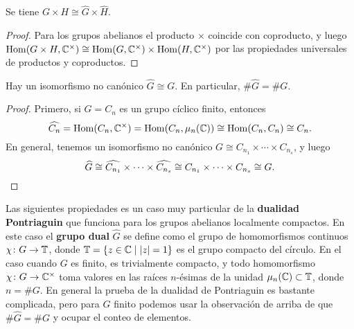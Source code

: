 \begin{lema}
  Se tiene $\widehat{G\times H} \cong \widehat{G}\times\widehat{H}$.

  \begin{proof}
    Para los grupos abelianos el producto $\times$ coincide con coproducto,
    y luego
    $\operatorname{Hom} (G\times H, \mathbb{C}^\times) \cong \operatorname{Hom} (G, \mathbb{C}^\times) \times \operatorname{Hom} (H, \mathbb{C}^\times)$
    por las propiedades universales de productos y coproductos.
  \end{proof}
\end{lema}

\begin{lema}
  Hay un isomorfismo no canónico $\widehat{G} \cong G$. En particular,
  $\#\widehat{G} = \# G$.

  \begin{proof}
    Primero, si $G = C_n$ es un grupo cíclico finito, entonces
    \[ \widehat{C_n} = \operatorname{Hom} (C_n, \mathbb{C}^\times) = \operatorname{Hom} (C_n, \mu_n (\mathbb{C})) \cong
    \operatorname{Hom} (C_n,C_n) \cong C_n. \]
    En general, tenemos un isomorfismo no canónico
    $G \cong C_{n_1}\times\cdots\times C_{n_s}$, y luego
    \[ \widehat{G} \cong \widehat{C_{n_1}}\times\cdots\times \widehat{C_{n_s}} \cong
       C_{n_1}\times\cdots\times C_{n_s} \cong G. \qedhere \]
  \end{proof}
\end{lema}

Las siguientes propiedades es un caso muy particular de
la \textbf{dualidad Pontriaguin} que funciona para los grupos abelianos
localmente compactos. En este caso el \textbf{grupo dual} $\widehat{G}$ se
define como el grupo de homomorfismos continuos $\chi\colon G\to \mathbb{T}$, donde
$\mathbb{T} = \{ z \in \mathbb{C} \mid |z| = 1 \}$ es el grupo compacto del círculo.
En el caso cuando $G$ es finito, es trivialmente compacto, y todo homomorfismo
$\chi\colon G\to \mathbb{C}^\times$ toma valores en las raíces $n$-ésimas de la unidad
$\mu_n (\mathbb{C}) \subset \mathbb{T}$, donde $n = \# G$. En general la prueba de
la dualidad de Pontriaguin es bastante complicada, pero para $G$ finito
podemos usar la observación de arriba de que $\#\widehat{G} = \# G$ y ocupar el
conteo de elementos.

